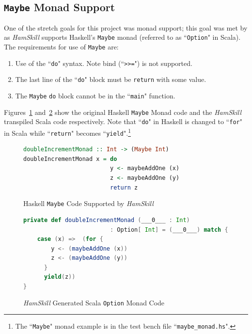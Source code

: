 \documentclass{report}
\begin{document}
\subsection{\texttt{Maybe} Monad Support}

One of the stretch goals for this project was monad support; this goal was met by as \textit{HamSkill} supports Haskell's \texttt{Maybe} monad (referred to as ``\texttt{Option}" in Scala).  The requirements for use of \texttt{Maybe} are:

\begin{enumerate}

\item Use of the ``\texttt{do}" syntax.  Note bind (``\texttt{>>=}") is not supported.

\item The last line of the ``\texttt{do}" block must be \texttt{return} with some value.

\item The \texttt{Maybe} \texttt{do} block cannot be in the ``\texttt{main}" function.

\end{enumerate}

Figures~\ref{fig:haskellMaybeMonad} and~\ref{fig:haskellOptionMonad} show the original Haskell \texttt{Maybe} Monad code and the \textit{HamSkill} transpiled Scala code respectively.  Note that ``\texttt{do}" in Haskell is changed to ``\texttt{for}" in Scala while ``\texttt{return}" becomes ``\texttt{yield}".\footnote{The ``\texttt{Maybe}" monad example is in the test bench file ``\texttt{maybe\_monad.hs}".}

\begin{figure}[H]
\begin{mdframed}
\begin{lstlisting}[language=Haskell]
doubleIncrementMonad :: Int -> (Maybe Int)
doubleIncrementMonad x = do
                         y <- maybeAddOne (x)
                         z <- maybeAddOne (y)
                         return z
\end{lstlisting}
\end{mdframed}
\caption{Haskell \texttt{Maybe} Code Supported by \textit{HamSkill}}
\label{fig:haskellMaybeMonad}
\end{figure}

\begin{figure}[H]
\begin{mdframed}
\begin{lstlisting}[language=Scala, basicstyle=\small]
private def doubleIncrementMonad (___0___ : Int) 
                         : Option[ Int] = (___0___) match {
    case (x) =>  (for {
        y <- (maybeAddOne (x))
        z <- (maybeAddOne (y))
      }
      yield(z))
}
\end{lstlisting}
\end{mdframed}
\caption{\textit{HamSkill} Generated Scala \texttt{Option} Monad Code}
\label{fig:haskellOptionMonad}
\end{figure}
\end{document}

